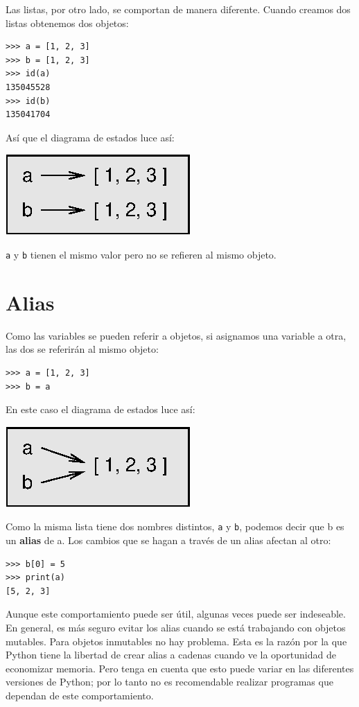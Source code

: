 Las listas, por otro lado, se comportan de manera diferente. Cuando
creamos dos listas obtenemos dos objetos:
\begin{lstlisting}
>>> a = [1, 2, 3]
>>> b = [1, 2, 3]
>>> id(a)
135045528
>>> id(b)
135041704
\end{lstlisting}
Así que el diagrama de estados luce así:

\beforefig \centerline{\includegraphics{illustrations/list2}}
\afterfig

\texttt{a} y \texttt{b} tienen el mismo valor pero no se refieren
al mismo objeto.

\section{Alias}

 

Como las variables se pueden referir a objetos, si asignamos una variable
a otra, las dos se referirán al mismo objeto:
\begin{lstlisting}
>>> a = [1, 2, 3]
>>> b = a
\end{lstlisting}
En este caso el diagrama de estados luce así:

\beforefig \centerline{\includegraphics{illustrations/list3}}
\afterfig

Como la misma lista tiene dos nombres distintos, \texttt{a} y \texttt{b},
podemos decir que b es un \textbf{alias} de a. Los cambios que se
hagan a través de un alias afectan al otro:
\begin{lstlisting}
>>> b[0] = 5
>>> print(a)
[5, 2, 3]
\end{lstlisting}
Aunque este comportamiento puede ser útil, algunas veces puede ser
indeseable. En general, es más seguro evitar los alias cuando se está
trabajando con objetos mutables. Para objetos inmutables no hay problema.
Esta es la razón por la que Python tiene la libertad de crear alias
a cadenas cuando ve la oportunidad de economizar memoria. Pero tenga
en cuenta que esto puede variar en las diferentes versiones de Python;
por lo tanto no es recomendable realizar programas que dependan de
este comportamiento.

